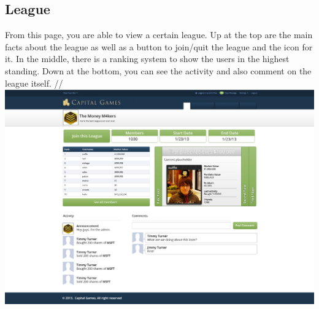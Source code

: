 \subsection{League}
From this page, you are able to view a certain league. Up at the top are the main facts about the league as well as a button to join/quit the league and the icon for it. In the middle, there is a ranking system to show the users in the highest standing. Down at the bottom, you can see the activity and also comment on the league itself. //
\includegraphics{./mockups/JPEG/Leagues_third.jpg}

